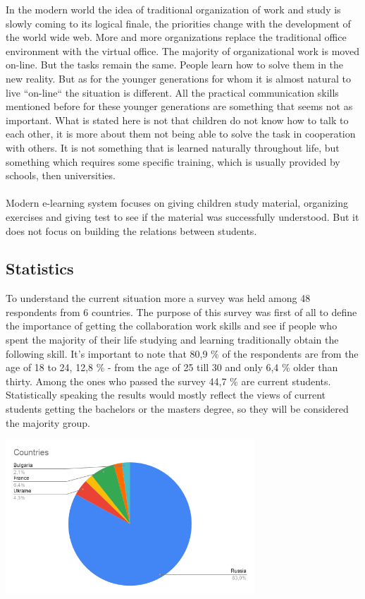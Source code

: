 \documentclass[10pt,oneside,english,a4paper]{article}
\begin{document}
In the modern world the idea of traditional organization of work and study is slowly coming to its logical finale, the priorities change with the development of the world wide web. More and more organizations replace the traditional office environment with the virtual office. The majority of organizational work is moved on-line. But the tasks remain the same. People learn how to solve them in the new reality. But as for the younger generations for whom it is almost natural to live ``on-line`` the situation is different. All the practical communication skills mentioned before for these younger generations are something that seems not as important. What is stated here is not that children do not know how to talk to each other, it is more about them not being able to solve the task in cooperation with others. It is not something that is learned naturally throughout life, but something which requires some specific training, which is usually provided by schools, then universities. \paragraph{}
Modern e-learning system focuses on giving children study material, organizing exercises and giving test to see if the material was successfully understood. But it does not focus on building the relations between students. 

\subsection{Statistics} \label{stat}
To understand the current situation more a survey was held among 48 respondents from 6 countries. The purpose of this survey was first of all to define the importance of getting the collaboration work skills and see if people who spent the majority of their life studying and learning traditionally obtain the following skill. It's important to note that 80,9 \% of the respondents are from the age of 18 to 24, 12,8 \% - from the age of 25 till 30 and only 6,4 \% older than thirty. Among the ones who passed the survey 44,7 \% are current students. Statistically speaking the results would mostly reflect the views of current students getting the bachelors or the masters degree, so they will be considered the majority group. 

\includegraphics[width=0.7\textwidth]{Countries.png}
\end{document}
